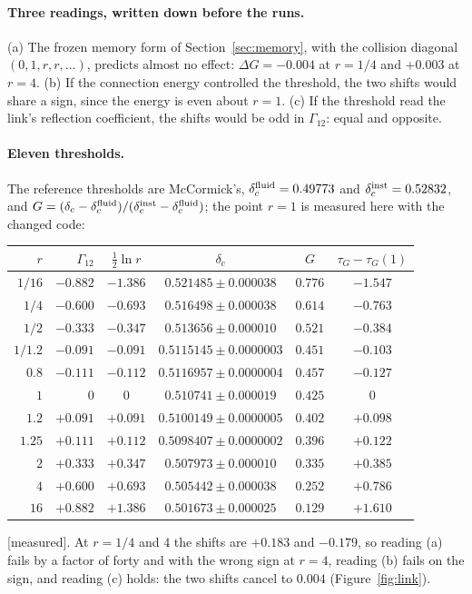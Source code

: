 \documentclass[11pt]{article}
\newcommand{\grade}[1]{\textsf{\small[#1]}}
\begin{document}
\paragraph{Three readings, written down before the runs.} (a) The frozen memory form of Section~\ref{sec:memory}, with the collision diagonal $(0,1,r,r,\dots)$, predicts almost no effect: $\Delta G=-0.004$ at $r=1/4$ and $+0.003$ at $r=4$. (b) If the connection energy controlled the threshold, the two shifts would share a sign, since the energy is even about $r=1$. (c) If the threshold read the link's reflection coefficient, the shifts would be odd in $\Gamma_{12}$: equal and opposite.

\paragraph{Eleven thresholds.} The reference thresholds are McCormick's, $\delta_c^{\rm fluid}=0.49773$ and $\delta_c^{\rm inst}=0.52832$, and $G=(\delta_c-\delta_c^{\rm fluid})/(\delta_c^{\rm inst}-\delta_c^{\rm fluid})$; the point $r=1$ is measured here with the changed code:
\begin{center}\begin{tabular}{rrcccc}\toprule
$r$ & $\Gamma_{12}$ & $\tfrac12\ln r$ & $\delta_c$ & $G$ & $\tau_G-\tau_G(1)$\\\midrule
$1/16$ & $-0.882$ & $-1.386$ & $0.521485\pm0.000038$ & $0.776$ & $-1.547$\\
$1/4$ & $-0.600$ & $-0.693$ & $0.516498\pm0.000038$ & $0.614$ & $-0.763$\\
$1/2$ & $-0.333$ & $-0.347$ & $0.513656\pm0.000010$ & $0.521$ & $-0.384$\\
$1/1.2$ & $-0.091$ & $-0.091$ & $0.5115145\pm0.0000003$ & $0.451$ & $-0.103$\\
$0.8$ & $-0.111$ & $-0.112$ & $0.5116957\pm0.0000004$ & $0.457$ & $-0.127$\\
$1$ & $0$ & $0$ & $0.510741\pm0.000019$ & $0.425$ & $0$\\
$1.2$ & $+0.091$ & $+0.091$ & $0.5100149\pm0.0000005$ & $0.402$ & $+0.098$\\
$1.25$ & $+0.111$ & $+0.112$ & $0.5098407\pm0.0000002$ & $0.396$ & $+0.122$\\
$2$ & $+0.333$ & $+0.347$ & $0.507973\pm0.000010$ & $0.335$ & $+0.385$\\
$4$ & $+0.600$ & $+0.693$ & $0.505442\pm0.000038$ & $0.252$ & $+0.786$\\
$16$ & $+0.882$ & $+1.386$ & $0.501673\pm0.000025$ & $0.129$ & $+1.610$\\\bottomrule\end{tabular}\end{center}
\grade{measured}. At $r=1/4$ and $4$ the shifts are $+0.183$ and $-0.179$, so reading (a) fails by a factor of forty and with the wrong sign at $r=4$, reading (b) fails on the sign, and reading (c) holds: the two shifts cancel to $0.004$ (Figure~\ref{fig:link}).
\end{document}
